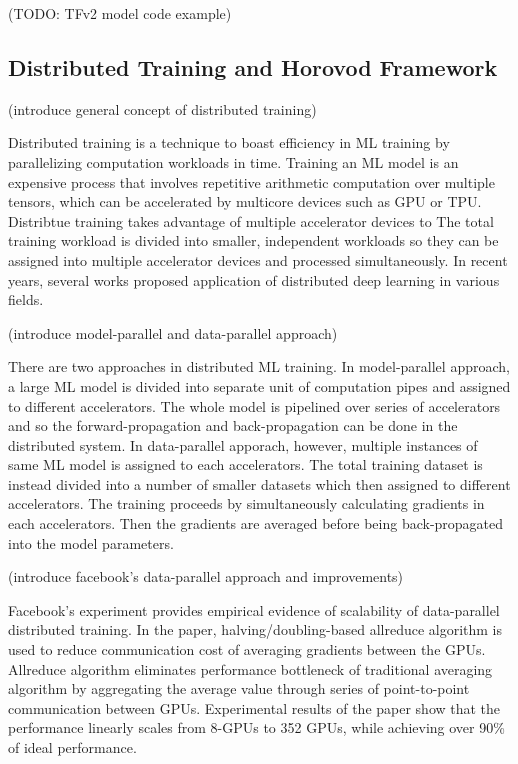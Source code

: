 (TODO: TFv2 model code example)

\subsection{Distributed Training and Horovod Framework}

(introduce general concept of distributed training)

Distributed training is a technique to boast efficiency in ML training
by parallelizing computation workloads in time.
Training an ML model is an expensive process that involves repetitive
arithmetic computation over multiple tensors,
which can be accelerated by multicore devices such as GPU or TPU. 
Distribtue training takes advantage of multiple accelerator devices to
The total training workload is divided into smaller, independent workloads
so they can be assigned into multiple accelerator devices and
processed simultaneously. 
In recent years, several works proposed application of distributed
deep learning in various fields.

(introduce model-parallel and data-parallel approach\cite{approaches2019Mao})

There are two approaches in distributed ML training.
In model-parallel approach, a large ML model is divided into separate unit
of computation pipes and assigned to different accelerators. The whole model
is pipelined over series of accelerators and so the forward-propagation and
back-propagation can be done in the distributed system.
In data-parallel apporach, however, multiple instances of same ML model
is assigned to each accelerators. The total training dataset is instead
divided into a number of smaller datasets which then assigned to different
accelerators. The training proceeds by simultaneously calculating gradients
in each accelerators. Then the gradients are averaged before being 
back-propagated into the model parameters.

(introduce facebook's data-parallel approach and improvements)

Facebook's experiment \cite{facebook2018} provides empirical evidence of
scalability of data-parallel distributed training. In the paper, 
halving/doubling-based allreduce algorithm is used to reduce communication cost 
of averaging gradients between the GPUs. 
Allreduce algorithm eliminates performance bottleneck of traditional
averaging algorithm by aggregating the average value through series of
point-to-point communication between GPUs. 
Experimental results of the paper show that the performance linearly
scales from 8-GPUs to 352 GPUs, while achieving over 90\% of ideal performance.

